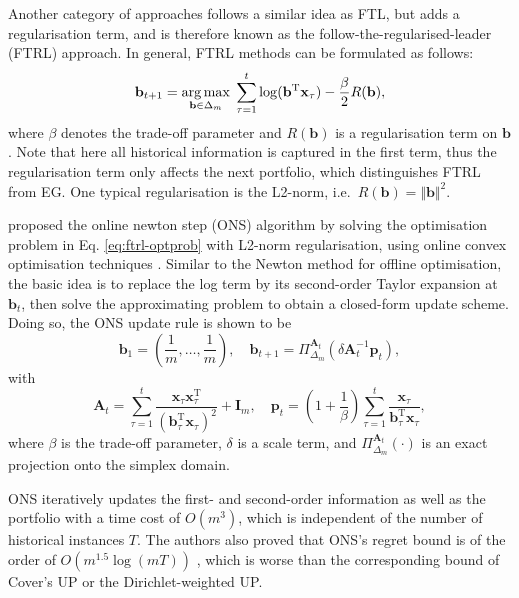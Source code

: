 Another category of approaches follows a similar idea as FTL, but adds a regularisation term, and is therefore known as the follow-the-regularised-leader (FTRL) approach. In general, FTRL methods can be formulated as follows:
\begin{equation}
\label{eq:ftrl-optprob}
	\mathbf{b}_{t+1}
	= \operatorname*{arg\,max}_{\mathbf{b}\in\Delta_m} \; \sum_{\tau=1}^t \log(\mathbf{b}^\text{T}\mathbf{x}_\tau) - \frac{\beta}{2}R(\mathbf{b}),
\end{equation}
where $\beta$ denotes the trade-off parameter and $R(\mathbf{b})$ is a regularisation term on $\mathbf{b}$. Note that here all historical information is captured in the first term, thus the regularisation term only affects the next portfolio, which distinguishes FTRL from EG. One typical regularisation is the L2-norm, i.e.\ $R(\mathbf{b}) = \Vert\mathbf{b}\Vert^2$.

\citet{ons} proposed the online newton step (ONS) algorithm by solving the optimisation problem in Eq. \eqref{eq:ftrl-optprob} with L2-norm regularisation, using online convex optimisation techniques \citep{ogd, hazan06, hazan07}. Similar to the Newton method for offline optimisation, the basic idea is to replace the log term by its second-order Taylor expansion at $\mathbf{b}_t$, then solve the approximating problem to obtain a closed-form update scheme. Doing so, the ONS update rule is shown to be \citep[Lemma~2]{ons}
\begin{equation}
	\mathbf{b}_1 = \left(\frac{1}{m}, \ldots, \frac{1}{m}\right),
	\quad \mathbf{b}_{t+1} = \Pi_{\Delta_m}^{\mathbf{A}_t}(\delta \mathbf{A}_t^{-1}\mathbf{p}_t),
\end{equation}
with
\begin{equation}
	\mathbf{A}_t = \sum_{\tau=1}^t \frac{\mathbf{x}_\tau \mathbf{x}_\tau^\text{T}}{(\mathbf{b}_\tau^\text{T}\mathbf{x}_\tau)^2} + \mathbf{I}_m,
	\quad \mathbf{p}_t = \left(1 + \frac{1}{\beta}\right)\sum_{\tau=1}^t \frac{\mathbf{x}_\tau}{\mathbf{b}_\tau^\text{T}\mathbf{x}_\tau},
\end{equation}
where $\beta$ is the trade-off parameter, $\delta$ is a scale term, and $\Pi_{\Delta_m}^{\mathbf{A}_t}(\cdot)$ is an exact projection onto the simplex domain.

ONS iteratively updates the first- and second-order information as well as the portfolio with a time cost of $O(m^3)$, which is independent of the number of historical instances $T$. The authors also proved that ONS's regret bound is of the order of $O(m^{1.5}\log(mT))$ \citep[Theorem~1]{ons}, which is worse than the corresponding bound of Cover's UP or the Dirichlet-weighted UP.


